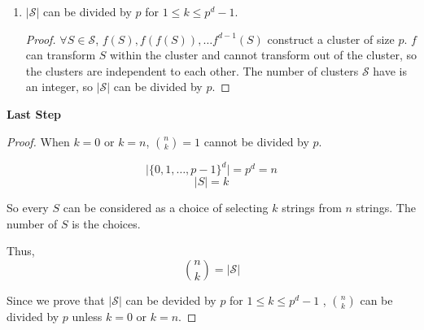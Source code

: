 \begin{enumerate}
\begin{proof}
        Thus, $f^{p-(p-1)t}(S) = S$. Since $t$ is the smallest, $t \leq p-(p-1)t$, $pt \leq t$, which contradicts $t > 1$.

        Therefore, $Period$ of $S$ is $p$. $S, f(S), \dots, f^{p-1}(S)$ are all different.
    \end{proof}

   \item $|\mathcal{S}|$ can be divided by $p$ for $1 \leq k \leq p^d - 1$.
   \begin{proof}
   $\forall S \in \mathcal{S}$, $f(S), f(f(S)), \dots f^{d-1}(S)$ construct a cluster of size $p$. $f$ can transform $S$ within the cluster and cannot transform out of the cluster, so the clusters are independent to each other. The number of clusters $\mathcal{S}$ have is an integer, so $\lvert \mathcal{S} \rvert$ can be divided by $p$.
   \end{proof}
   \end{enumerate}

   \textbf{Last Step}

\begin{proof}
When $k=0$ or $k=n$, ${n \choose k} = 1$ cannot be divided by $p$.

$$ \lvert \{0, 1, \dots, p-1\}^d \rvert = p^d = n $$
$$ \lvert S \rvert = k $$ 

So every $ S $ can be considered as a choice of selecting $k$ strings from $n$ strings. The number of $S$ is the choices.

Thus, $${n \choose k} = \lvert \mathcal{S} \rvert$$ 

Since we prove that $\lvert \mathcal{S} \rvert$ can be devided by $p$ for $1 \leq k \leq p^d - 1$ , ${n \choose k}$ can be divided by $p$ unless $k=0$ or $k=n$.
\end{proof}


